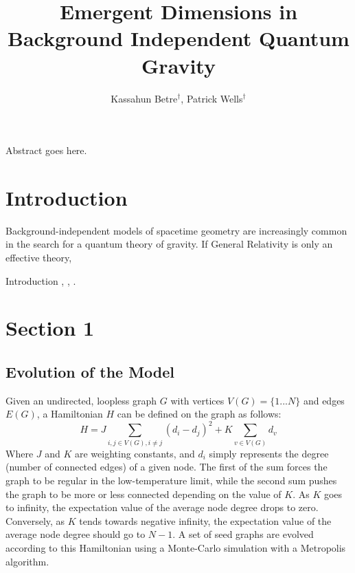 \documentclass[prd,12pt,nofootinbib]{revtex4}
\begin{document}
\begin{titlepage}
\title{Emergent Dimensions in Background Independent Quantum Gravity}
\author{Kassahun Betre$^{\dagger}$, Patrick Wells$^{\dagger}$}
\address{$^{\dagger}$Pepperdine University, 24255 Pacific Coast Hwy, Malibu, CA 90263, USA}

\maketitle

\begin{Abstract}
Abstract goes here.

\end{Abstract}

\end{titlepage}

\section{Introduction}
Background-independent models of spacetime geometry are increasingly common in the search for a quantum theory of gravity. If General Relativity is only an effective theory,  

Introduction \cite{Konopka:2008hp}, \cite{Chen:2012ui}, \cite{Konopka:2008ds}.
\section{Section 1}
\subsection{Evolution of the Model} 
Given an undirected, loopless graph $G$ with vertices $V(G) = \{ 1...N\}$ and edges $E(G)$, a Hamiltonian $H$ can be defined on the graph as follows:
\begin{equation}
H = J\sum_{i,j\in V(G), i\neq j}(d_i - d_j)^2 + K\sum_{v\in V(G)}d_v
\end{equation}
Where $J$ and $K$ are weighting constants, and $d_i$ simply represents the degree (number of connected edges) of a given node. The first of the sum forces the graph to be regular in the low-temperature limit, while the second sum pushes the graph to be more or less connected depending on the value of $K$. As $K$ goes to infinity, the expectation value of the average node degree drops to zero. Conversely, as $K$ tends towards negative infinity, the expectation value of the average node degree should go to $N-1$.
A set of seed graphs are evolved according to this Hamiltonian using a Monte-Carlo simulation with a Metropolis algorithm. 
\end{document}
